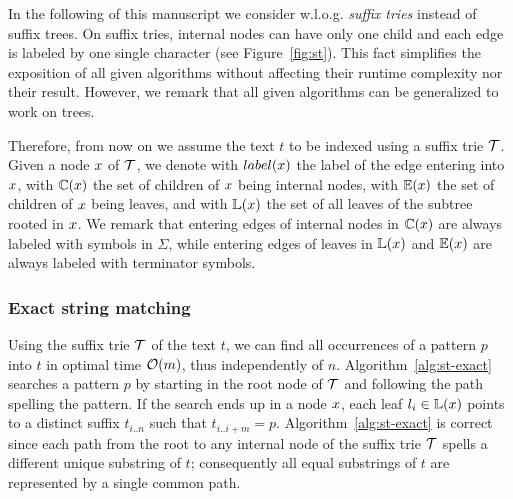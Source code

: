 In the following of this manuscript we consider w.l.o.g. \emph{suffix tries} instead of suffix trees.
On suffix tries, internal nodes can have only one child and each edge is labeled by one single character (see Figure~\ref{fig:st}).
This fact simplifies the exposition of all given algorithms without affecting their runtime complexity nor their result.
However, we remark that all given algorithms can be generalized to work on trees.

\begin{figure}[h]
\caption{Suffix tree and suffix trie for the string ANANAS.}
\label{fig:stree}
\begin{subfigure}{.5\textwidth}
\begin{center}

\end{center}
\end{subfigure}%
\begin{subfigure}{.5\textwidth}
\begin{center}

\end{center}
\end{subfigure}
\end{figure}

Therefore, from now on we assume the text $t$ to be indexed using a suffix trie $\mathcal {T}$.
Given a node $x$ of $\mathcal {T}$, we denote with $label(x)$ the label of the edge entering into $x$, with $\mathbb {C}(x)$ the set of children of $x$ being internal nodes, with $\mathbb {E}(x)$ the set of children of $x$ being leaves, and with $\mathbb {L}(x)$ the set of all leaves of the subtree rooted in $x$. We remark that entering edges of internal nodes in $\mathbb {C}(x)$ are always labeled with symbols in $\Sigma$, while entering edges of leaves in $\mathbb {L}(x)$ and $\mathbb {E}(x)$ are always labeled with terminator symbols.

\subsubsection{Exact string matching}

Using the suffix trie $\mathcal {T}$ of the text $t$, we can find all occurrences of a pattern $p$ into $t$ in optimal time $\mathcal{O}(m)$, thus independently of $n$.
Algorithm~\ref{alg:st-exact} searches a pattern $p$ by starting in the root node of $\mathcal {T}$ and following the path spelling the pattern.
If the search ends up in a node $x$, each leaf $l_i \in \mathbb {L}(x)$ points to a distinct suffix $t_{i..n}$ such that $t_{i..i+m} = p$.
Algorithm~\ref{alg:st-exact} is correct since each path from the root to any internal node of the suffix trie $\mathcal {T}$ spells a different unique substring of $t$; consequently all equal substrings of $t$ are represented by a single common path.

